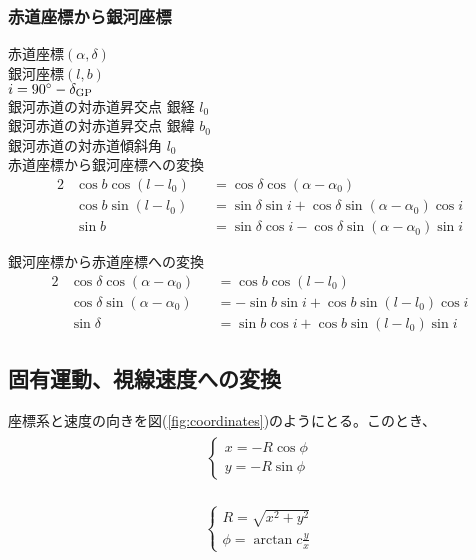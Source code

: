 \subsubsection{赤道座標から銀河座標}
赤道座標$(\alpha, \delta)$ \\
銀河座標$(l, b)$ \\
$i = 90^{\circ} - \delta_{\rm GP}$\\
銀河赤道の対赤道昇交点 銀経 $l_0$\\
銀河赤道の対赤道昇交点 銀緯 $b_0$\\
銀河赤道の対赤道傾斜角 $l_0$\\

赤道座標から銀河座標への変換
\begin{alignat}{2}
    &\cos b \cos(l-l_0)& &= \cos\delta \cos(\alpha-\alpha_0) \\
    &\cos b \sin(l-l_0)& &= \sin\delta \sin i + \cos\delta \sin(\alpha-\alpha_0) \cos i \\
    &\sin b& &= \sin\delta \cos i - \cos\delta \sin(\alpha-\alpha_0) \sin i
\end{alignat}

銀河座標から赤道座標への変換
\begin{alignat}{2}
    &\cos \delta \cos(\alpha-\alpha_0)& &= \cos b \cos(l-l_0) \\
    &\cos \delta \sin(\alpha-\alpha_0)& &= -\sin b \sin i + \cos b \sin(l-l_0) \cos i \\
    &\sin \delta& &= \sin b \cos i + \cos b \sin(l-l_0) \sin i
\end{alignat}




\subsection{固有運動、視線速度への変換}
座標系と速度の向きを図(\ref{fig:coordinates})のようにとる。このとき、
\begin{align}
\begin{aligned}
    \begin{cases}
    x = -R\cos{\phi}\\
    y = -R\sin{\phi}
    \end{cases}
\end{aligned}
\end{align}

\begin{align}
\begin{aligned}
    \begin{cases}
    R = \sqrt{x^2 + y^2}\\
    \phi = \arctan{c\frac{y}{x}}
    \end{cases}
\end{aligned}
\end{align}


